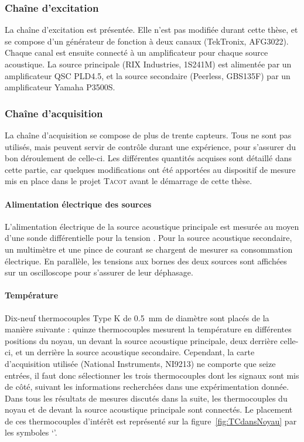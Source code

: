 \subsubsection{Chaîne d'excitation}
La chaîne d'excitation est présentée. Elle n'est pas modifiée durant cette thèse, et se compose d'un générateur de fonction à deux canaux (TekTronix, AFG3022). Chaque canal est ensuite connecté à un amplificateur pour chaque source acoustique. La source principale (RIX Industries, 1S241M) est alimentée par un amplificateur QSC PLD4.5, et la source secondaire (Peerless, GBS135F) par un amplificateur Yamaha P3500S.\medskip


\subsubsection{Chaîne d'acquisition}
La chaîne d'acquisition se compose de plus de trente capteurs. Tous ne sont pas utilisés, mais peuvent servir de contrôle durant une expérience, pour s'assurer du bon déroulement de celle-ci. Les différentes quantités acquises sont détaillé dans cette partie, car quelques modifications ont été apportées au dispositif de mesure mis en place dans le projet \textsc{Tacot} avant le démarrage de cette thèse.

\paragraph{Alimentation électrique des sources} L'alimentation électrique de la source acoustique principale est mesurée au moyen d'une sonde différentielle pour la tension . Pour la source acoustique secondaire, un multimètre  et une pince de courant  se chargent de mesurer sa consommation électrique. En parallèle, les tensions aux bornes des deux sources sont affichées sur un oscilloscope pour s'assurer de leur déphasage.

\paragraph{Température} Dix-neuf thermocouples Type K de \qty{.5}{\milli\meter} de diamètre sont placés de la manière suivante : quinze thermocouples mesurent la température en différentes positions du noyau, un devant la source acoustique principale, deux derrière celle-ci, et un derrière la source acoustique secondaire. Cependant, la carte d'acquisition utilisée (National Instruments, NI9213) ne comporte que seize entrées, il faut donc sélectionner les trois thermocouples dont les signaux sont mis de côté, suivant les informations recherchées dans une expérimentation donnée. Dans tous les résultats de mesures discutés dans la suite, les thermocouples du noyau et de devant la source acoustique principale sont connectés. Le placement de ces thermocouples d'intérêt est représenté sur la figure~\ref{fig:TCdansNoyau} par les symboles `\textcolor{cyan}{\textbullet}'.

